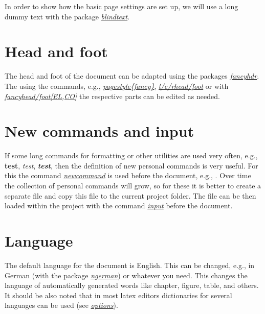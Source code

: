 \documentclass[a4paper,11pt,oneside]{book}
\newcommand{\imp}[1]{\underline{\textit{#1}}}
\begin{document}
In order to show how the basic page settings are set up, we will use a long dummy text with the package \imp{blindtext}.

\blindtext[6]

\blindtext

\blindtext[7]


\section{Head and foot}

The head and foot of the document can be adapted using the packages \imp{fancyhdr}. The using the commands, e.g., \imp{pagestyle\{fancy\}}, \imp{l/c/rhead/foot} or with \imp{fancyhead/foot[EL,CO]} the respective parts can be edited as needed.


\section{New commands and input}

If some long commands for formatting or other utilities are used very often, e.g., \textbf{test}, \textit{test}, \textbf{\textit{test}}, then the definition of new personal commands is very useful. For this the command \imp{newcommand} is used before the document, e.g., . Over time the collection of personal commands will grow, so for these it is better to create a separate file and copy this file to the current project folder. The file can be then loaded within the project with the command \imp{input} before the document.


\section{Language}

The default language for the document is English. This can be changed, e.g., in German (with the package \imp{ngerman}) or whatever you need. This changes the language of automatically generated words like chapter, figure, table, and others. It should be also noted that in most latex editors dictionaries for several languages can be used (see \imp{options}).
\end{document}
